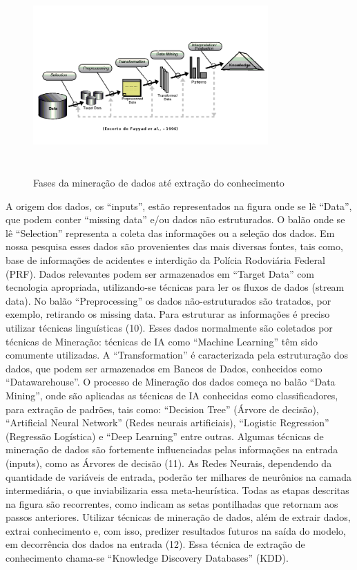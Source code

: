 \documentclass[conference,compsoc]{IEEEtran}
\begin{document}
\begin{figure}[!ht]
\centering
\caption{Fases da mineração de dados até extração do conhecimento}
\flushleft
\includegraphics[width=90mm, height=75mm]{Figuras/FayyadSemFundo.png}
\end{figure}


A origem dos dados, os “inputs”, estão representados na figura onde se
lê “Data”, que podem conter ``missing data'' e/ou dados não estruturados. O balão onde se lê
“Selection” representa a coleta das informações ou a seleção dos
dados. Em nossa pesquisa esses dados são provenientes
das mais diversas fontes, tais como, base de informações de acidentes e interdição da Polícia Rodoviária Federal (PRF). 
Dados relevantes podem ser armazenados em “Target Data” com tecnologia
apropriada, utilizando-se técnicas para ler os fluxos de
dados (stream data).
No balão ``Preprocessing'' os dados não-estruturados são tratados, por
exemplo, retirando os missing data. Para estruturar as informações é
preciso utilizar técnicas linguísticas (10). Esses dados normalmente são coletados por técnicas de
Mineração: técnicas de IA como ``Machine Learning'' têm sido comumente
utilizadas. A ``Transformation'' é caracterizada pela estruturação dos dados, que 
podem ser armazenados em Bancos de Dados, conhecidos como ``Datawarehouse''.
O processo de Mineração dos dados começa no balão “Data Mining”,
onde são aplicadas as técnicas de IA conhecidas como classificadores,
para extração de padrões, tais como: ``Decision Tree'' (Árvore de
decisão), ``Artificial Neural Network'' (Redes neurais artificiais),
``Logistic Regression'' (Regressão Logística) e ``Deep Learning'' entre outras.
Algumas técnicas de mineração de dados são fortemente
influenciadas pelas informações na entrada (inputs), como as Árvores
de decisão (11). As Redes Neurais, dependendo da quantidade de
variáveis de entrada, poderão ter milhares de neurônios na camada
intermediária, o que inviabilizaria essa meta-heurística.
Todas as etapas descritas na figura são recorrentes, como indicam
as setas pontilhadas que retornam aos passos anteriores. Utilizar
técnicas de mineração de dados, além de extrair dados, extrai
conhecimento e, com isso, predizer resultados futuros na
saída do modelo, em decorrência dos dados na entrada (12).
Essa técnica de extração de conhecimento chama-se ``Knowledge
Discovery Databases'' (KDD).
\end{document}
